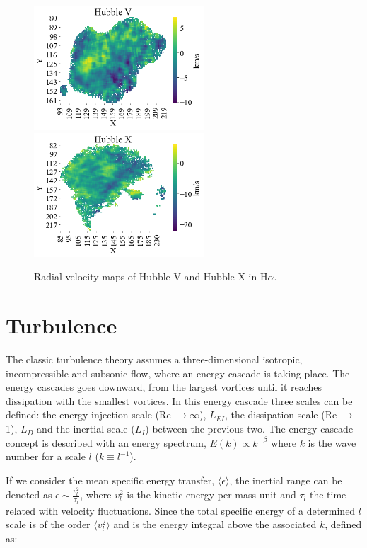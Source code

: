 \documentclass[fleqn,usenatbib]{mnras}
\begin{document}
\begin{figure}
\centering 
\includegraphics[width=2.5in]{Figures/MV.png}
\includegraphics[width=2.5in]{Figures/MX.png}
\caption{Radial velocity maps of Hubble V and Hubble X in H$\alpha$.}
\label{fig:MHub}
\end{figure}


\section{Turbulence}\label{sec:turb}

The classic turbulence theory \citep{kolm1} assumes a three-dimensional isotropic, incompressible and subsonic flow, where an energy cascade is taking place. The energy cascades goes downward, from the largest vortices until it reaches dissipation with the smallest vortices. 
In this energy cascade three scales can be defined: the energy injection scale (Re $\rightarrow \infty$), $L_{EI}$, the dissipation scale (Re $\rightarrow$ 1), $L_{D}$ and the inertial scale ($L_{I}$) between the previous two. The energy cascade concept is described with an energy spectrum, $E(k) \propto k^{-\beta}$ where $k$ is the wave number for a scale $l$ ($k \equiv l^{-1}$).

If we consider the mean specific energy transfer, $\langle \epsilon \rangle$, the inertial range can be denoted as $\epsilon \sim \frac{v_{l}^{2}}{\tau_{l}}$, where $v_{l}^{2}$ is the kinetic energy per mass unit and $\tau_{l}$ the time related with velocity fluctuations. Since the total specific energy of a determined $l$ scale is of the order $\langle v_{l}^{2} \rangle$ and is the energy integral above the associated $k$, defined as:
\end{document}
